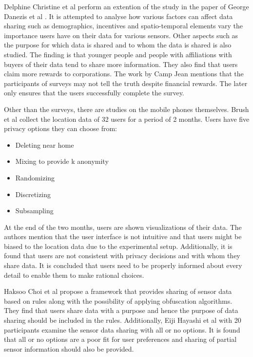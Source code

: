 Delphine Christine et al \cite{christin2013s} perform an extention of the study in the paper of George Danezis et al \cite{danezis2005much}. It is attempted to analyse how various factors can affect data sharing such as demographics, incentives and spatio-temporal elements vary the importance users have on their data for various sensors. Other aspects such as the purpose for which data is shared and to whom the data is shared is also studied. The finding is that younger people and people with affiliations with buyers of their data tend to share more information. They also find that users claim more rewards to corporations. The work by Camp Jean \cite{camp2005state} mentions that the participants of surveys may not tell the truth despite financial rewards. The later only ensures that the users successfully complete the survey.

Other than the surveys, there are studies on the mobile phones themselves. Brush et al \cite{brush2010exploring} collect the location data of 32 users for a period of 2 months. Users have five privacy options they can choose from:

\begin{itemize}
\item Deleting near home
\item Mixing to provide k anonymity
\item Randomizing
\item Discretizing
\item Subsampling
\end{itemize}

At the end of the two months, users are shown visualizations of their data. The authors mention that the user interface is not intuitive and that users might be biased to the location data due to the experimental setup. Additionally, it is found that users are not consistent with privacy decisions and with whom they share data. It is concluded that users need to be properly informed about every detail to enable them to make rational choices.

Haksoo Choi et al \cite{choi2011sensorsafe} propose a framework that provides sharing of sensor data based on rules along with the possibility of applying obfuscation algorithms. They find that users share data with a purpose and hence the purpose of data sharing should be included in the rules. Additionally, Eiji Hayashi et al \cite{hayashi2012goldilocks} with 20 participants examine the sensor data sharing with all or no options. It is found that all or no options are a poor fit for user preferences and sharing of partial sensor information should also be provided.

